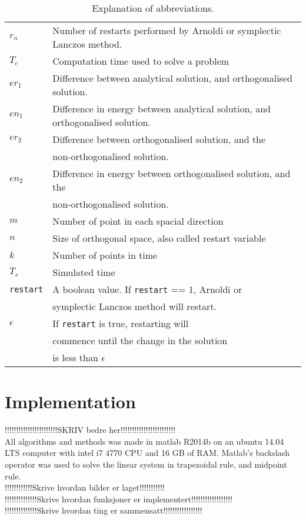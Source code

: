\begin{table}[h]
\centering
\begin{tabular}{l| l}
$r_n$	& Number of restarts performed by Arnoldi or symplectic Lanczos method.  \\
$T_c$	& Computation time used to solve a problem \\
$er_1$ 	& Difference between analytical solution, and orthogonalised solution. \\
$en_1$ 	& Difference in energy between analytical solution, and orthogonalised solution. \\
$er_2$ 	& Difference between orthogonalised solution, and the\\& non-orthogonalised solution. \\
$en_2$ 	& Difference in energy between orthogonalised solution, and the\\& non-orthogonalised solution. \\
$m$ 		& Number of point in each spacial direction \\
$n$ 		& Size of orthogonal space, also called restart variable \\
$k$ 		& Number of points in time \\
$T_s$ 	& Simulated time \\
\texttt{restart}& A boolean value. If \texttt{restart} == 1, Arnoldi or \\&symplectic Lanczos method will restart. \\
$\epsilon$ & If \texttt{restart} is true, restarting will\\& commence until the change in the solution\\& is less than $\epsilon$ \\
\end{tabular}
\caption{ Explanation of abbreviations. }
\label{tab:labels}
\end{table}

\section{Implementation}
!!!!!!!!!!!!!!!!!!!!!!!SKRIV bedre her!!!!!!!!!!!!!!!!!!!!!!!!\\
All algorithms and methods was made in matlab R2014b on an ubuntu 14.04 LTS computer with intel i7 4770 CPU and 16 GB of RAM. Matlab's backslash operator was used to solve the linear system in trapezoidal rule, and midpoint rule. \\
!!!!!!!!!!!!Skrive hvordan bilder er laget!!!!!!!!!!!\\
!!!!!!!!!!!!!!Skrive hvordan funksjoner er implementert!!!!!!!!!!!!!!!!!!\\
!!!!!!!!!!!!!!Skrive hvordan ting er sammensatt!!!!!!!!!!!!!!!!!\\

